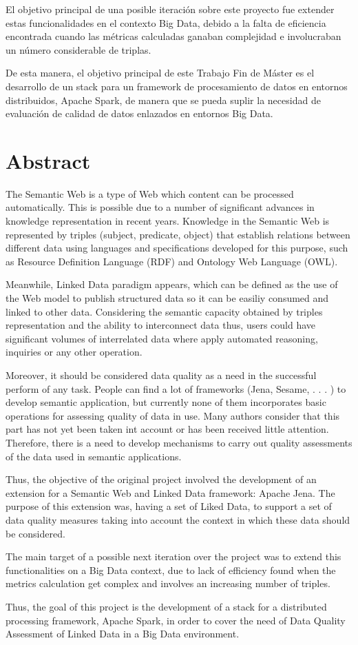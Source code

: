El objetivo principal de una posible iteración sobre este proyecto fue extender
estas funcionalidades en el contexto Big Data, debido a la falta de eficiencia
encontrada cuando las métricas calculadas ganaban complejidad e involucraban un
número considerable de triplas.

De esta manera, el objetivo principal de este Trabajo Fin de Máster es el
desarrollo de un stack para un framework de procesamiento de datos en entornos
distribuidos, Apache Spark, de manera que se pueda suplir la necesidad de
evaluación de calidad de datos enlazados en entornos Big Data. 


\chapter{Abstract}


The Semantic Web is a type of Web which content can be processed
automatically. This is possible due to a number of significant advances in
knowledge representation in recent years. Knowledge in the Semantic Web is
represented by triples (subject, predicate, object) that establish relations
between different data using languages and specifications developed for this
purpose, such as Resource Definition Language (\acs{RDF}) and Ontology Web Language
(\acs{OWL}).

Meanwhile, Linked Data paradigm appears, which can be defined as the use of the
Web model to publish structured data so it can be easiliy consumed and linked to
other data. Considering the semantic capacity obtained by triples representation
and the ability to interconnect data thus, users could have significant volumes
of interrelated data where apply automated reasoning, inquiries or any other
operation.

Moreover, it should be considered data quality as a need in the successful
perform of any task. People can find a lot of frameworks (Jena, Sesame, . . . )
to develop semantic application, but currently none of them incorporates basic
operations for assessing quality of data in use. Many authors consider that this
part has not yet been taken int account or has been received little
attention. Therefore, there is a need to develop mechanisms to carry out quality
assessments of the data used in semantic applications.

Thus, the objective of the original project involved the development of an
extension for a Semantic Web and Linked Data framework: Apache Jena. The purpose
of this extension was, having a set of Liked Data, to support a set of data
quality measures taking into account the context in which these data should be
considered.

The main target of a possible next iteration over the project was to extend this
functionalities on a Big Data context, due to lack of efficiency found when the
metrics calculation get complex and involves an increasing number of triples.

Thus, the goal of this project is the development of a stack for a
distributed processing framework, Apache Spark, in order to cover the need of
Data Quality Assessment of Linked Data in a Big Data environment. 

